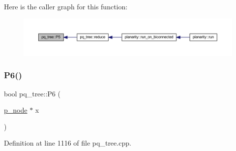 Here is the caller graph for this function\+:\nopagebreak
\begin{figure}[H]
\begin{center}
\leavevmode
\includegraphics[width=350pt]{classpq__tree_a274efe525064f511488091d318f1588e_icgraph}
\end{center}
\end{figure}
\mbox{\label{classpq__tree_afbc208233ab34b2d0ed9e9a7fb5e19a7}} 
\subsubsection{\texorpdfstring{P6()}{P6()}}
{\footnotesize\ttfamily bool pq\+\_\+tree\+::\+P6 (\begin{DoxyParamCaption}\item[{\mbox{\hyperlink{classp__node}{p\+\_\+node}} $\ast$}]{x }\end{DoxyParamCaption})\hspace{0.3cm}{\ttfamily [private]}}



Definition at line 1116 of file pq\+\_\+tree.\+cpp.


